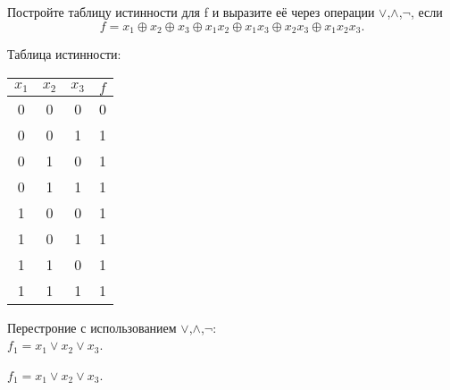 \begin{exercise}
Постройте таблицу истинности для f и выразите её через операции $\vee$,$\wedge$,$\neg$, если
\begin{equation}
		f=x_1\oplus x_2\oplus x_3\oplus x_1x_2\oplus x_1x_3\oplus x_2x_3\oplus 			x_1x_2x_3.
\end{equation}

\end{exercise}

\begin{solution}
Таблица истинности: \\
\begin{center}
 \begin{tabular}{| c c c | c |}
  \hline	
 $ x_1$ & $x_2$ & $x_3$ & $f$ \\ [0,5 ex]
  \hline\hline
  0 & 0 & 0 & 0\\ [1,5 ex]
  \hline
  0 & 0 & 1 & 1 \\ [1,5 ex]
  \hline
  0 & 1 & 0 & 1 \\ [1,5 ex]
  \hline
  0 & 1 & 1 & 1 \\ [1,5 ex]
  \hline
  1 & 0 & 0 & 1 \\ [1,5 ex]
  \hline
  1 & 0 & 1 & 1 \\ [1,5 ex]
  \hline
  1 & 1 & 0 & 1 \\ [1,5 ex]
  \hline
  1 & 1 & 1 & 1 \\ [1,5 ex]
  \hline
 \end{tabular}
 \end{center}
Перестроние с использованием  $\vee$,$\wedge$,$\neg$: \\$f_1=x_1\vee x_2\vee x_3$.
\end{solution}

\begin{answer}
$f_1=x_1\vee x_2\vee x_3$.
\end{answer}